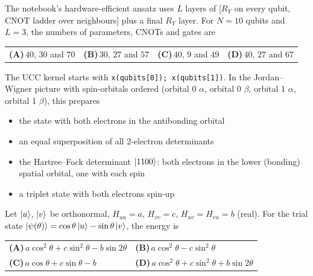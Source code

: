 \documentclass[11pt,a4paper]{article}
\newcommand{\optlabel}[1]{\textbf{(#1)}}
\newenvironment{qitem}[1]{\begin{list}{}{\setlength{\leftmargin}{3.3em}\setlength{\labelwidth}{3.1em}%
  \setlength{\labelsep}{0.2em}\setlength{\topsep}{3pt}\setlength{\parsep}{3pt}}\item[\textbf{Q.#1}\hfill]}{\end{list}}
\newcommand{\qsep}{\par\vspace{2pt}{\color{black!15}\hrule}\vspace{4pt}}
\begin{document}
\begin{qitem}{43}
The notebook's hardware-efficient ansatz uses $L$ layers of [$R_Y$ on every qubit, CNOT ladder over neighbours] plus a final $R_Y$ layer. For
$N = 10$ qubits and $L = 3$, the numbers of parameters, CNOTs and gates are
\par\smallskip\noindent\begin{tabularx}{\linewidth}{@{}*{4}{L}@{}}
\optlabel{A}\,$40$, $30$ and $70$ & \optlabel{B}\,$30$, $27$ and $57$ & \optlabel{C}\,$40$, $9$ and $49$ & \optlabel{D}\,$40$, $27$ and $67$
\end{tabularx}
\end{qitem}
\qsep

\begin{qitem}{44}
The UCC kernel starts with \texttt{x(qubits[0]); x(qubits[1])}. In the Jordan--Wigner picture with spin-orbitals ordered (orbital 0 $\alpha$, orbital 0 $\beta$,
orbital 1 $\alpha$, orbital 1 $\beta$), this prepares
\begin{itemize}[leftmargin=2.6em, labelsep=0.4em, itemsep=2pt, topsep=3pt]
\item[\optlabel{A}] the state with both electrons in the antibonding orbital
\item[\optlabel{B}] an equal superposition of all 2-electron determinants
\item[\optlabel{C}] the Hartree--Fock determinant $\ket{1100}$: both electrons in the lower (bonding) spatial orbital, one with each spin
\item[\optlabel{D}] a triplet state with both electrons spin-up
\end{itemize}
\end{qitem}
\qsep

\begin{qitem}{45}
Let $\ket u$, $\ket v$ be orthonormal, $H_{uu} = a$, $H_{vv} = c$, $H_{uv} = H_{vu} = b$ (real). For the trial state $\ket{\psi(\theta)} = \cos\theta\ket u - \sin\theta\ket v$, the energy is
\par\smallskip\noindent\begin{tabularx}{\linewidth}{@{}*{2}{L}@{}}
\optlabel{A}\,$a\cos^2\theta + c\sin^2\theta - b\sin2\theta$ & \optlabel{B}\,$a\cos^2\theta - c\sin^2\theta$ \\[3pt]
\optlabel{C}\,$a\cos\theta + c\sin\theta - b$ & \optlabel{D}\,$a\cos^2\theta + c\sin^2\theta + b\sin2\theta$
\end{tabularx}
\end{qitem}
\qsep
\end{document}
